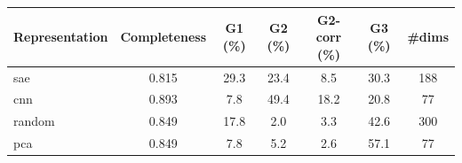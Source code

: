 \begin{tabular}{lcccccc}
\toprule
Representation & Completeness & G1 (\%) & G2 (\%) & G2-corr (\%) & G3 (\%) & \#dims \\
\midrule
sae & 0.815 & 29.3 & 23.4 & 8.5 & 30.3 & 188 \\
cnn & 0.893 & 7.8 & 49.4 & 18.2 & 20.8 & 77 \\
random & 0.849 & 17.8 & 2.0 & 3.3 & 42.6 & 300 \\
pca & 0.849 & 7.8 & 5.2 & 2.6 & 57.1 & 77 \\
\bottomrule
\end{tabular}